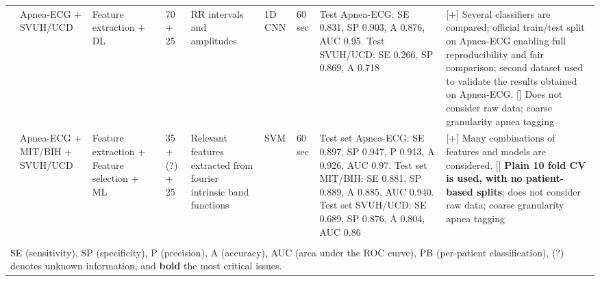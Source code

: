 \documentclass[5p,twocolumn,lefttitle]{elsarticle}
\begin{document}
\begin{table*}[!ht]
{\begin{tabularx}{2\textwidth}{@{}m{2.5em}p{7em}p{10em}lp{2em}p{12em}p{7em}p{3em}p{17em}X@{}}
            \cmidrule(l){2-10} 
                            & Apnea-ECG + SVUH/UCD                                    & Feature extraction + DL                                        & \cite{wang2019sleep}                     & 70 + 25       & RR intervals and amplitudes                                                                                      & 1D CNN                              & 60 sec                                     & Test Apnea-ECG: SE 0.831, SP 0.903, A 0.876, AUC 0.95. Test SVUH/UCD: SE 0.266, SP 0.869, A 0.718                                                                                           & [+] Several classifiers are compared; official train/test split on Apnea-ECG enabling full reproducibility and fair comparison; second dataset used to validate the results obtained on Apnea-ECG. [] Does not consider raw data; coarse granularity apnea tagging                                                                                                                                                                           \\
            \cmidrule(l){2-10} 
                            & Apnea-ECG + MIT/BIH + SVUH/UCD                          & Feature extraction + Feature selection + ML                    & \cite{fatimah2020detection}              & 35 + (?) + 25 & Relevant features extracted from fourier intrinsic band functions                                                 & SVM                                 & 60 sec                                     & Test set Apnea-ECG: SE 0.897, SP 0.947, P 0.913, A 0.926, AUC 0.97. Test set MIT/BIH: SE 0.881, SP 0.889, A 0.885, AUC 0.940. Test set SVUH/UCD: SE 0.689, SP 0.876, A 0.804, AUC 0.86 & [+] Many combinations of features and models are considered. [] \textbf{Plain 10 fold CV is used, with no patient-based splits}; does not consider raw data; coarse granularity apnea tagging                                                                                                                                                                                                                                                      \\
\bottomrule \\
\multicolumn{10}{l}{\large SE (sensitivity), SP (specificity), P (precision), A (accuracy), AUC (area under the ROC curve), PB (per-patient classification), (?) denotes unknown information, and \textbf{bold} the most critical issues.}
\end{tabularx}}
\end{table*}
\end{document}
